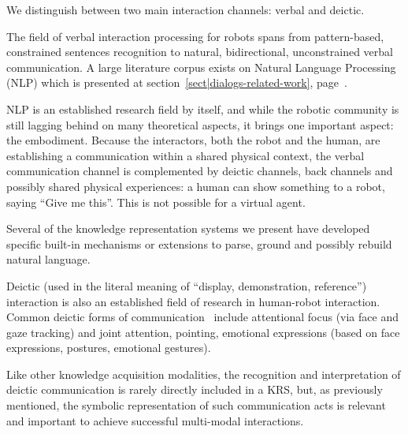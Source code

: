 We distinguish between two main interaction channels: verbal and deictic.

\begin{scriptsize}
\begin{center}
\end{center}
\end{scriptsize}

\label{sect|nlp}

The field of verbal interaction processing for robots spans from pattern-based,
constrained sentences recognition to natural, bidirectional, unconstrained
verbal communication. A large literature corpus exists on Natural Language
Processing (NLP) which is presented at section~\ref{sect|dialogs-related-work},
page~\pageref{sect|dialogs-related-work}.

NLP is an established research field by itself, and while the robotic community
is still lagging behind on many theoretical aspects, it brings one important
aspect: the embodiment. Because the interactors, both the robot and the human,
are establishing a communication within a shared physical context, the verbal
communication channel is complemented by deictic channels, back channels and
possibly shared physical experiences: a human can show something to a robot,
saying ``Give me this''. This is not possible for a virtual agent.

Several of the knowledge representation systems we present have developed
specific built-in mechanisms or extensions to parse, ground and possibly
rebuild natural language.

Deictic (used in the literal meaning of ``display, demonstration, reference'')
interaction is also an established field of research in human-robot
interaction. Common deictic forms of communication~\cite{Li2012} include
attentional focus (via face and gaze tracking) and joint attention, pointing,
emotional expressions (based on face expressions, postures, emotional
gestures).

Like other knowledge acquisition modalities, the recognition and interpretation
of deictic communication is rarely directly included in a KRS, but, as
previously mentioned, the symbolic representation of such communication acts is
relevant and important to achieve successful multi-modal interactions.

